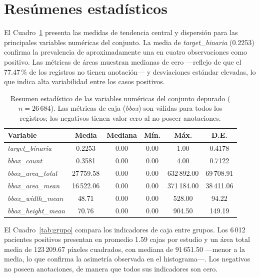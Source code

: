 \documentclass[11pt,spanish]{article}
\begin{document}
\section{Resúmenes estadísticos}

El Cuadro~\ref{tab:estadisticos} presenta las medidas de tendencia central y dispersión
para las principales variables numéricas del conjunto. La media de \textit{target\_binaria}
(0.2253) confirma la prevalencia de aproximadamente una en cuatro observaciones como positivo.
Las métricas de áreas muestran medianas de cero —reflejo de que el 77.47\,\% de los registros
no tienen anotación— y desviaciones estándar elevadas, lo que indica alta variabilidad entre
los casos positivos.

\begin{table}[H]
\centering
\small
\caption{Resumen estadístico de las variables numéricas del conjunto depurado ($n = 26\,684$).
         Las métricas de caja (\textit{bbox}) son válidas para todos los registros;
         los negativos tienen valor cero al no poseer anotaciones.}
\label{tab:estadisticos}
\begin{tabular}{lccccc}
\toprule
\textbf{Variable} & \textbf{Media} & \textbf{Mediana} & \textbf{Mín.} & \textbf{Máx.} & \textbf{D.E.} \\
\midrule
\textit{target\_binaria}     & 0.2253  & 0.00   & 0.00 & 1.00      & 0.4178  \\
\textit{bbox\_count}          & 0.3581  & 0.00   & 0.00 & 4.00      & 0.7122  \\
\textit{bbox\_area\_total}    & 27\,759.58 & 0.00 & 0.00 & 632\,892.00 & 69\,708.91 \\
\textit{bbox\_area\_mean}     & 16\,522.06 & 0.00 & 0.00 & 371\,184.00 & 38\,411.06 \\
\textit{bbox\_width\_mean}    & 48.71   & 0.00   & 0.00 & 528.00    & 94.22  \\
\textit{bbox\_height\_mean}   & 70.76   & 0.00   & 0.00 & 904.50    & 149.19 \\
\bottomrule
\end{tabular}
\end{table}

El Cuadro~\ref{tab:grupo} compara los indicadores de caja entre grupos. Los 6\,012 pacientes
positivos presentan en promedio 1.59 cajas por estudio y un área total media de 123\,209.67
píxeles cuadrados, con mediana de 91\,651.50 —menor a la media, lo que confirma la asimetría
observada en el histograma—. Los negativos no poseen anotaciones, de manera que todos sus
indicadores son cero.
\end{document}
